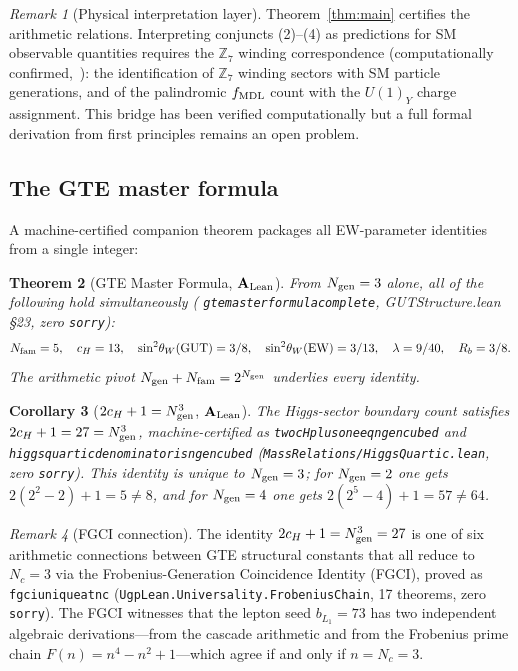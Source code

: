 \documentclass[11pt]{article}
\newtheorem{theorem}{Theorem}[section]
\newtheorem{corollary}[theorem]{Corollary}
\theoremstyle{remark}
\newtheorem{remark}[theorem]{Remark}
\newcommand{\ZS}{\mathbb{Z}_7}
\newcommand{\Ngen}{N_{\rm gen}}
\newcommand{\Nfam}{N_{\rm fam}}
\newcommand{\cH}{c_H}
\newcommand{\fmdl}{f_{\rm MDL}}
\newcommand{\lean}[1]{%
  \penalty-100
  \begingroup\def\_{\textunderscore\allowbreak}\texttt{#1}\endgroup}
\newcommand{\sinwsq}{\sin^2\!\theta_W}
\newcommand{\lam}{\lambda}
\newcommand{\CatAL}{\ensuremath{\textbf{A}_{\rm Lean}}}
\begin{document}
\begin{remark}[Physical interpretation layer]
Theorem~\ref{thm:main} certifies the arithmetic relations.
Interpreting conjuncts (2)--(4) as predictions for SM observable quantities
requires the $\ZS$ winding correspondence (computationally confirmed,~\cite{Spivack2026_SM_UGP}):
the identification of $\ZS$ winding sectors with SM particle generations,
and of the palindromic $\fmdl$ count with the $U(1)_Y$ charge assignment.
This bridge has been verified computationally but a full formal derivation
from first principles remains an open problem.
\end{remark}

\subsection{The GTE master formula}
\label{sec:master_formula}

A machine-certified companion theorem packages all EW-parameter identities from a single integer:

\begin{theorem}[GTE Master Formula, $\CatAL$]
\label{thm:master}
From $\Ngen = 3$ alone, all of the following hold simultaneously
(\lean{gte\_master\_formula\_complete}, GUTStructure.lean \S23, zero \texttt{sorry}):
\[
  \Nfam = 5,\quad \cH = 13,\quad
  \sinwsq(\text{GUT}) = 3/8,\quad
  \sinwsq(\text{EW}) = 3/13,\quad
  \lam = 9/40,\quad R_b = 3/8.
\]
The arithmetic pivot $\Ngen + \Nfam = 2^{\Ngen}$ underlies every identity.
\end{theorem}

\begin{corollary}[$2c_H + 1 = \Ngen^3$, $\CatAL$]
\label{cor:ch_ngen_cube}
The Higgs-sector boundary count satisfies $2c_H + 1 = 27 = \Ngen^3$, machine-certified
as \lean{two\_cH\_plus\_one\_eq\_ngen\_cubed} and \lean{higgs\_quartic\_denominator\_is\_ngen\_cubed}
(\texttt{MassRelations/HiggsQuartic.lean}, zero \texttt{sorry}).
This identity is unique to $\Ngen = 3$; for $\Ngen = 2$ one gets $2(2^2-2)+1 = 5 \neq 8$,
and for $\Ngen = 4$ one gets $2(2^5-4)+1 = 57 \neq 64$.
\end{corollary}

\begin{remark}[FGCI connection]
The identity $2c_H + 1 = \Ngen^3 = 27$ is one of six arithmetic connections between GTE structural constants that all reduce to $N_c = 3$ via the Frobenius-Generation Coincidence Identity (FGCI), proved as \lean{fgci\_unique\_at\_nc} (\texttt{UgpLean.Universality.FrobeniusChain}, 17 theorems, zero \texttt{sorry}).  The FGCI witnesses that the lepton seed $b_{L_1} = 73$ has two independent algebraic derivations---from the cascade arithmetic and from the Frobenius prime chain $F(n) = n^4 - n^2 + 1$---which agree if and only if $n = N_c = 3$.
\end{remark}
\end{document}
